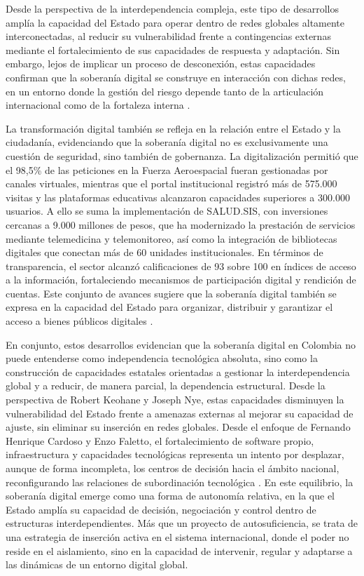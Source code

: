 Desde la perspectiva de la interdependencia compleja, este tipo de desarrollos amplía la capacidad del Estado para operar dentro de redes globales altamente interconectadas, al reducir su vulnerabilidad frente a contingencias externas mediante el fortalecimiento de sus capacidades de respuesta y adaptación. Sin embargo, lejos de implicar un proceso de desconexión, estas capacidades confirman que la soberanía digital se construye en interacción con dichas redes, en un entorno donde la gestión del riesgo depende tanto de la articulación internacional como de la fortaleza interna \parencite{keohane_nye_power_2011}.

La transformación digital también se refleja en la relación entre el Estado y la ciudadanía, evidenciando que la soberanía digital no es exclusivamente una cuestión de seguridad, sino también de gobernanza. La digitalización permitió que el 98,5\% de las peticiones en la Fuerza Aeroespacial fueran gestionadas por canales virtuales, mientras que el portal institucional registró más de 575.000 visitas y las plataformas educativas alcanzaron capacidades superiores a 300.000 usuarios. A ello se suma la implementación de SALUD.SIS, con inversiones cercanas a 9.000 millones de pesos, que ha modernizado la prestación de servicios mediante telemedicina y telemonitoreo, así como la integración de bibliotecas digitales que conectan más de 60 unidades institucionales. En términos de transparencia, el sector alcanzó calificaciones de 93 sobre 100 en índices de acceso a la información, fortaleciendo mecanismos de participación digital y rendición de cuentas. Este conjunto de avances sugiere que la soberanía digital también se expresa en la capacidad del Estado para organizar, distribuir y garantizar el acceso a bienes públicos digitales \parencite{fac_informe_rendicion_2023,mindefensa_audiencia_rendicion_2025}.

En conjunto, estos desarrollos evidencian que la soberanía digital en Colombia no puede entenderse como independencia tecnológica absoluta, sino como la construcción de capacidades estatales orientadas a gestionar la interdependencia global y a reducir, de manera parcial, la dependencia estructural. Desde la perspectiva de Robert Keohane y Joseph Nye, estas capacidades disminuyen la vulnerabilidad del Estado frente a amenazas externas al mejorar su capacidad de ajuste, sin eliminar su inserción en redes globales. Desde el enfoque de Fernando Henrique Cardoso y Enzo Faletto, el fortalecimiento de software propio, infraestructura y capacidades tecnológicas representa un intento por desplazar, aunque de forma incompleta, los centros de decisión hacia el ámbito nacional, reconfigurando las relaciones de subordinación tecnológica \parencite{keohane_nye_power_2011,cardoso_faletto_dependencia_1977}.
En este equilibrio, la soberanía digital emerge como una forma de autonomía relativa, en la que el Estado amplía su capacidad de decisión, negociación y control dentro de estructuras interdependientes. Más que un proyecto de autosuficiencia, se trata de una estrategia de inserción activa en el sistema internacional, donde el poder no reside en el aislamiento, sino en la capacidad de intervenir, regular y adaptarse a las dinámicas de un entorno digital global.

